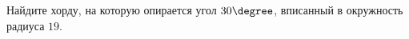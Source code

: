 \begin{ex}
	\begin{condition}
		Найдите хорду, на которую опирается угол \( 30\degree\), вписанный в окружность радиуса \( 19 \).
	\end{condition}
\end{ex}